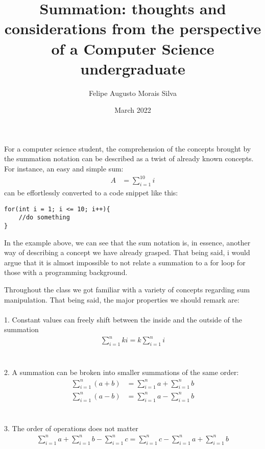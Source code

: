 \documentclass{article}
\title{Summation: thoughts and considerations from the perspective of a Computer Science undergraduate}
\author{Felipe  Augusto Morais Silva}
\date{March 2022}
\begin{document}
\maketitle
For a computer science student, the comprehension of the concepts brought by the summation notation can be described as a twist of already known concepts.
For instance, an easy and simple sum:
\begin{align*}
  A &= \sum_{i=1}^{10} i
\end{align*}
can be effortlessly converted to a code snippet like this:
\begin{lstlisting}
for(int i = 1; i <= 10; i++){
    //do something
}
\end{lstlisting}
In the example above, we can see that the sum notation is, in essence, another way of describing a concept we have already grasped. That being said, i would argue that it is almost impossible to not relate a summation to a for loop for those with a programming background.

Throughout the class we got familiar with a variety of concepts regarding sum manipulation. That being said, the major properties we should remark are:
\\%
\\
1. Constant values can freely shift between the inside and the outside of the summation
\begin{align*}
    \sum_{i=1}^{n}ki = k\sum_{i=1}^{n}i 
\end{align*}
\\
\\
2. A summation can be broken into smaller summations of the same order:
\begin{align*}
    \sum_{i=1}^{n}(a+b) &= \sum_{i=1}^{n}a + \sum_{i=1}^{n}b
\end{align*}
\begin{align*}
\sum_{i=1}^{n}(a-b) &= \sum_{i=1}^{n}a - \sum_{i=1}^{n}b
\end{align*}
\\
\\
3. The order of operations does not matter
\begin{align*}
    \sum_{i=1}^{n}a + \sum_{i=1}^{n}b - \sum_{i=1}^{n}c = \sum_{i=1}^{n}c - \sum_{i=1}^{n}a + \sum_{i=1}^{n}b
\end{align*}
\end{document}
